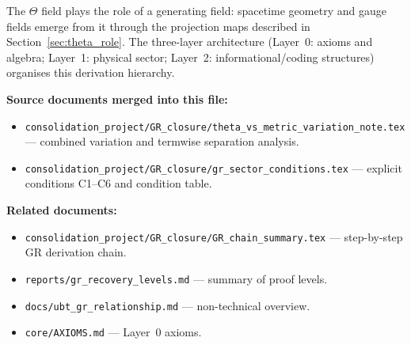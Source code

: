 \documentclass[12pt]{article}
\theoremstyle{definition}
\theoremstyle{remark}
\begin{document}
The $\Theta$ field plays the role of a generating field: spacetime geometry
and gauge fields emerge from it through the projection maps described in
Section~\ref{sec:theta_role}.  The three-layer architecture (Layer~0:
axioms and algebra; Layer~1: physical sector; Layer~2: informational/coding
structures) organises this derivation hierarchy.

\medskip\noindent
\textbf{Source documents merged into this file:}
\begin{itemize}
  \item \texttt{consolidation\_project/GR\_closure/theta\_vs\_metric\_variation\_note.tex}
    — combined variation and termwise separation analysis.
  \item \texttt{consolidation\_project/GR\_closure/gr\_sector\_conditions.tex}
    — explicit conditions C1--C6 and condition table.
\end{itemize}

\medskip\noindent
\textbf{Related documents:}
\begin{itemize}
  \item \texttt{consolidation\_project/GR\_closure/GR\_chain\_summary.tex}
    — step-by-step GR derivation chain.
  \item \texttt{reports/gr\_recovery\_levels.md} — summary of proof levels.
  \item \texttt{docs/ubt\_gr\_relationship.md} — non-technical overview.
  \item \texttt{core/AXIOMS.md} — Layer~0 axioms.
\end{itemize}
\end{document}
